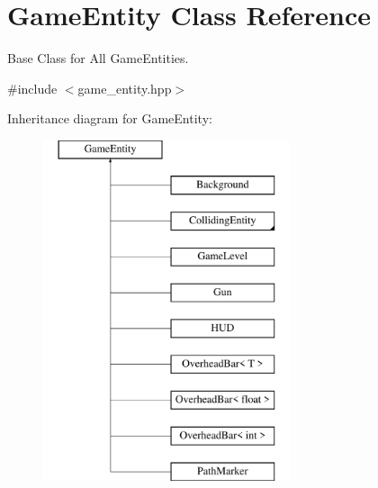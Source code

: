 \hypertarget{class_game_entity}{}\section{Game\+Entity Class Reference}
\label{class_game_entity}


Base Class for All Game\+Entities.  




{\ttfamily \#include $<$game\+\_\+entity.\+hpp$>$}

Inheritance diagram for Game\+Entity\+:\begin{figure}[H]
\begin{center}
\leavevmode
\includegraphics[height=10.000000cm]{class_game_entity}
\end{center}
\end{figure}
